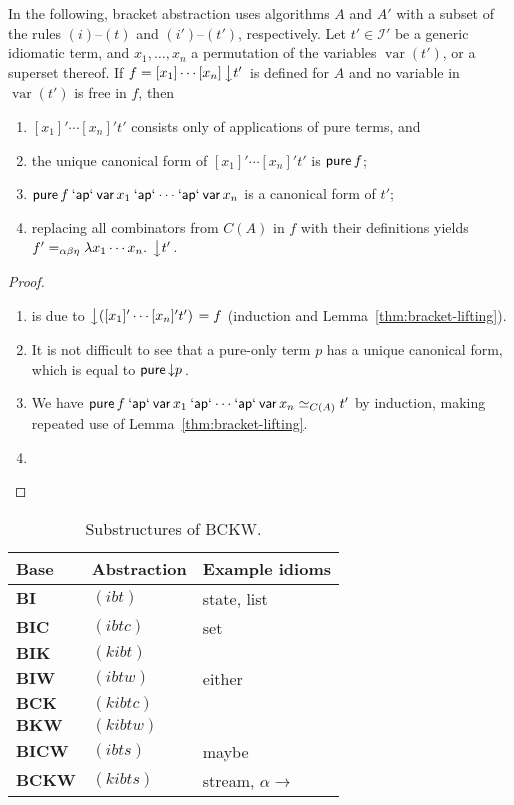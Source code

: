 \begin{theorem}\label{thm:unlifting}
In the following, bracket abstraction uses algorithms $A$ and $A'$ with
a subset of the rules $(i)$--$(t)$ and $(i')$--$(t')$, respectively.
Let $t' \in \mathcal{I}'$ be a generic idiomatic term, and $x_1,\dots,x_n$
a permutation of the variables $\operatorname{var}(t')$, or a superset thereof.
If $f = [x_1]\cdots[x_n]\left\downarrow t'\right.$ is defined for $A$ and no variable in
$\operatorname{var}(t')$ is free in $f$, then
\begin{enumerate}
\item $[x_1]'\cdots[x_n]'t'$ consists only of applications of pure terms, and
\item the unique canonical form of $[x_1]'\cdots[x_n]'t'$ is $\operatorname{\mathsf{pure}} f$;
\item $\operatorname{\mathsf{pure}} f \mathbin{\mathsf{`ap`}} \operatorname{\mathsf{var}} x_1 \mathbin{\mathsf{`ap`}} \cdots \mathbin{\mathsf{`ap`}} \operatorname{\mathsf{var}} x_n$ is a canonical
	form of $t'$;
\item replacing all combinators from $C(A)$ in $f$ with their definitions
	yields $f' =_{\alpha\beta\eta} \lambda x_1\cdots x_n.\>\left\downarrow t'\right.$.
\end{enumerate}
\end{theorem}
\begin{proof}
\begin{enumerate}
\item is due to $\left\downarrow ([x_1]'\cdots[x_n]'t')\right. = f$ (induction and
	Lemma~\ref{thm:bracket-lifting}).
\item It is not difficult to see that a pure-only term $p$ has a unique canonical
	form, which is equal to $\operatorname{\mathsf{pure}} \left\downarrow p\right.$.
\item We have $\operatorname{\mathsf{pure}} f \mathbin{\mathsf{`ap`}} \operatorname{\mathsf{var}} x_1 \mathbin{\mathsf{`ap`}} \cdots \mathbin{\mathsf{`ap`}} \operatorname{\mathsf{var}} x_n \simeq_{C(A)} t'$
	by induction, making repeated use of Lemma~\ref{thm:bracket-lifting}.
\item \todo
\end{enumerate}
\end{proof}

\begin{table}\centering
\begin{tabular}{lll} Base & Abstraction & Example idioms \\
\hline
$\mathbf{BI}$ & $(ibt)$ & state, list \\
$\mathbf{BIC}$ & $(ibtc)$ & set \\
$\mathbf{BIK}$ & $(kibt)$ & \\
$\mathbf{BIW}$ & $(ibtw)$ & either \\
$\mathbf{BCK}$ & $(kibtc)$ & \\
$\mathbf{BKW}$ & $(kibtw)$ & \\
$\mathbf{BICW}$ & $(ibts)$ & maybe \\
$\mathbf{BCKW}$ & $(kibts)$ & stream, $\alpha \to$ \\
\end{tabular}
\caption{Substructures of BCKW.}
\label{tab:combinator-bases}
\end{table}


